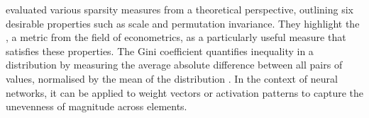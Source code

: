 \citet{hurley2009gini} evaluated various sparsity measures from a theoretical perspective, outlining six desirable properties such as scale and permutation invariance. They highlight the , a metric from the field of econometrics, as a particularly useful measure that satisfies these properties. The Gini coefficient quantifies inequality in a distribution by measuring the average absolute difference between all pairs of values, normalised by the mean of the distribution \citep{hurley2009gini}. In the context of neural networks, it can be applied to weight vectors or activation patterns to capture the unevenness of magnitude across elements.
 





